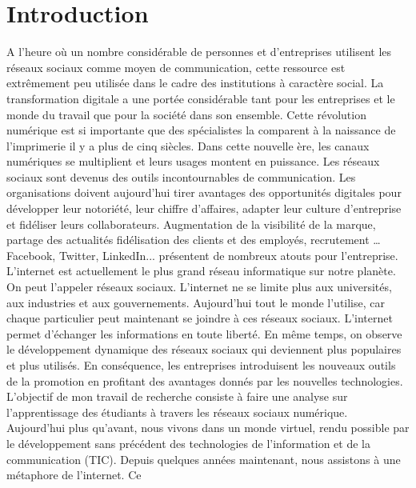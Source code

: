 \documentclass[12pt,a4paper,titlepage]{article}
\begin{document}
\section{Introduction}
A l’heure où un nombre considérable de personnes et d’entreprises utilisent les réseaux
sociaux comme moyen de communication, cette ressource est extrêmement peu utilisée dans
le cadre des institutions à caractère social. \newline
La transformation digitale a une portée considérable tant pour les entreprises et le monde du
travail que pour la société dans son ensemble. Cette révolution numérique est si importante
que des spécialistes la comparent à la naissance de l’imprimerie il y a plus de cinq siècles.
Dans cette nouvelle ère, les canaux numériques se multiplient et leurs usages montent en
puissance. Les réseaux sociaux sont devenus des outils incontournables de communication.
Les organisations doivent aujourd’hui tirer avantages des opportunités digitales pour
développer leur notoriété, leur chiffre d’affaires, adapter leur culture d’entreprise et fidéliser
leurs collaborateurs. Augmentation de la visibilité de la marque, partage des actualités fidélisation des clients et des employés, recrutement … Facebook, Twitter, LinkedIn...
présentent de nombreux atouts pour l’entreprise. \newline
L’internet est actuellement le plus grand réseau informatique sur notre planète. On peut
l’appeler réseaux sociaux. L’internet ne se limite plus aux universités, aux industries et aux
gouvernements. Aujourd’hui tout le monde l’utilise, car chaque particulier peut maintenant se
joindre à ces réseaux sociaux. L’internet permet d’échanger les informations en toute liberté.
En même temps, on observe le développement dynamique des réseaux sociaux qui deviennent
plus populaires et plus utilisés. \newline
En conséquence, les entreprises introduisent les nouveaux outils de la promotion en profitant
des avantages donnés par les nouvelles technologies. \newline
L’objectif de mon travail de recherche consiste à faire une analyse sur l’apprentissage des
étudiants à travers les réseaux sociaux numérique. \newline
Aujourd’hui plus qu’avant, nous vivons dans un monde virtuel, rendu possible par le
développement sans précédent des technologies de l’information et de la communication (TIC). \newline
Depuis quelques années maintenant, nous assistons à une métaphore de l’internet. Ce
\end{document}
